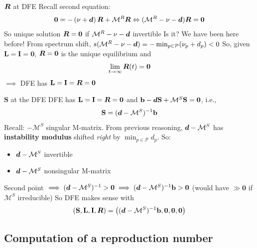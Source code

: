 \documentclass[aspectratio=169]{beamer}\usepackage[]{graphicx}\usepackage[]{xcolor}
\begin{document}
\begin{frame}{$\bm{R}$ at DFE}
Recall second equation:
$$
\mathbf{0} =-\left(\mathbf{\nu}+\bm{d}\right)\bm{R}+\mathcal{M}^R\bm{R} \Leftrightarrow (\mathcal{M}^R-\mathbf{\nu}-\bm{d})\bm{R}=\mathbf{0}
$$
\vfill
So unique solution $\bm{R}=\mathbf{0}$ if $\mathcal{M}^R-\mathbf{\nu}-\bm{d}$ invertible
Is it?
\vfill
We have been here before! 
\vfill
From spectrum shift, $s(\mathcal{M}^R-\mathbf{\nu}-\bm{d})=-\min_{p\in\mathcal{P}}(\nu_p+d_p)<0$
\vfill
So, given $\mathbf{L}=\mathbf{I}=\mathbf{0}$, $\bm{R}=\mathbf{0}$ is the unique equilibrium and
$$
\lim_{t\to\infty}\bm{R}(t)=\mathbf{0}
$$
\vfill
$\implies$ DFE has $\mathbf{L}=\mathbf{I}=\bm{R}=\mathbf{0}$
\end{frame}


\begin{frame}{$\mathbf{S}$ at the DFE}
DFE has $\mathbf{L}=\mathbf{I}=\bm{R}=\mathbf{0}$ and $\mathbf{b}-\bm{d}\mathbf{S}+\mathcal{M}^S\mathbf{S}=\mathbf{0}$, i.e.,
$$
\mathbf{S}=(\bm{d}-\mathcal{M}^S)^{-1}\mathbf{b}
$$
\vfill
Recall: $-\mathcal{M}^S$ singular M-matrix. From previous reasoning, $\bm{d}-\mathcal{M}^S$ has \textbf{instability modulus} shifted \emph{right} by $\min_{p\in\mathcal{P}}d_p$. So:
\begin{itemize}
\item $\bm{d}-\mathcal{M}^S$ invertible
\item $\bm{d}-\mathcal{M}^S$ nonsingular M-matrix
\end{itemize}
\vfill
Second point $\implies (\bm{d}-\mathcal{M}^S)^{-1}>\mathbf{0}\implies (\bm{d}-\mathcal{M}^S)^{-1}\mathbf{b}> \mathbf{0}$  (would have $\gg\mathbf{0}$ if $\mathcal{M}^S$ irreducible)
\vfill
So DFE makes sense with
$$
(\mathbf{S},\mathbf{L},\mathbf{I},\bm{R})=\left((\bm{d}-\mathcal{M}^S)^{-1}\mathbf{b},\mathbf{0},\mathbf{0},\mathbf{0}\right)
$$
\end{frame}

\subsection{Computation of a reproduction number}

\end{document}
